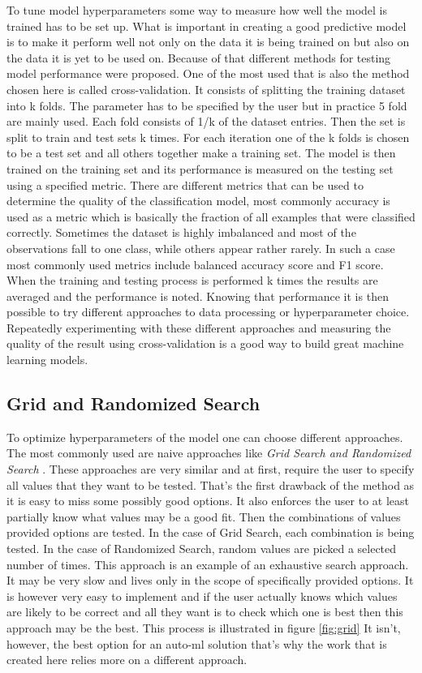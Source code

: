 \documentclass[a4paper,twoside,12pt]{book}
\begin{document}
To tune model hyperparameters some way to measure how well the model is trained has to be set up. What is important in creating a good predictive model is to make it perform well not only on the data it is being trained on but also on the data it is yet to be used on.
Because of that different methods for testing model performance were proposed. One of the most used that is also the method chosen here is called cross-validation.
It consists of splitting the training dataset into k folds. The parameter has to be specified by the user but in practice 5 fold are mainly used. Each fold consists of 1/k of the dataset entries. Then the set is split to train and test sets k times. For each iteration one of the k folds is chosen to be a test set and all others together make a training set. 
The model is then trained on the training set and its performance is measured on the testing set using a specified metric.
There are different metrics that can be used to determine the quality of the classification model, most commonly accuracy is used as a metric which is basically the fraction of all examples that were classified correctly.
Sometimes the dataset is highly imbalanced and most of the observations fall to one class, while others appear rather rarely. In such a case most commonly used metrics include balanced accuracy score and F1 score.
When the training and testing process is performed k times the results are averaged and the performance is noted.
Knowing that performance it is then possible to try different approaches to data processing or hyperparameter choice. Repeatedly experimenting with these different approaches and measuring the quality of the result using cross-validation is a good way to build great machine learning models.

\subsection{Grid and Randomized Search}

To optimize hyperparameters of the model one can choose different approaches. The most commonly used are naive approaches like \emph{Grid Search and Randomized Search} \cite{bergstra2012random}.
These approaches are very similar and at first, require the user to specify all values that they want to be tested. That's the first drawback of the method as it is easy to miss some possibly good options. It also enforces the user to at least partially know what values may be a good fit.
Then the combinations of values provided options are tested. In the case of Grid Search, each combination is being tested. In the case of Randomized Search, random values are picked a selected number of times.
This approach is an example of an exhaustive search approach. It may be very slow and lives only in the scope of specifically provided options. 
It is however very easy to implement and if the user actually knows which values are likely to be correct and all they want is to check which one is best then this approach may be the best. This process is illustrated in figure \ref{fig:grid}
It isn't, however, the best option for an auto-ml solution that's why the work that is created here relies more on a different approach.
\end{document}
